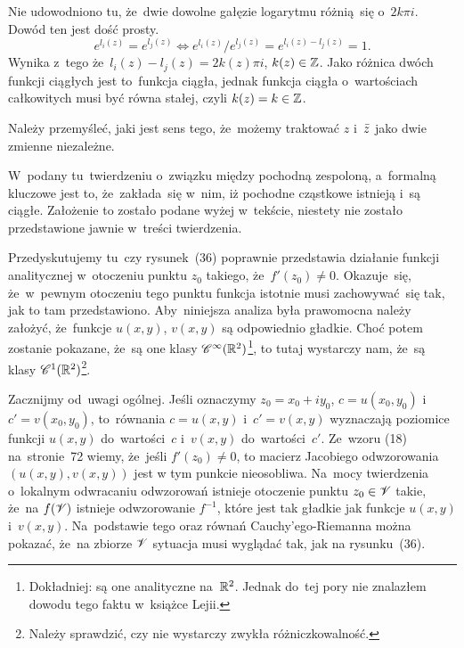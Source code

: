 \documentclass[a4paper,11pt]{article}
\begin{document}
\start {} Nie udowodniono tu, że~dwie dowolne gałęzie logarytmu
różnią~się o~$2 k \pi i$. Dowód ten jest dość prosty.
\begin{equation}
  \label{eq:Leja-38}
  e^{ l_{ i }( z ) } = e^{ l_{ j }( z ) }
  \iff e^{ l_{ i }( z ) } / e^{ l_{ j }( z ) } = e^{ l_{ i }( z ) - l_{ j }( z ) }
  = 1.
\end{equation}
Wynika z~tego że~$l_{ i }( z ) - l_{ j }( z ) = 2 k( z ) \pi i$,
$k( z ) \in \mathbb{Z}$. Jako różnica dwóch funkcji ciągłych jest to~funkcja
ciągła, jednak funkcja ciągła o~wartościach całkowitych musi być równa
stałej, czyli $k( z ) = k \in \mathbb{Z}$.

\vspace{\spaceFour}



\start {} Należy przemyśleć, jaki jest sens tego, że~możemy
traktować $z$ i~$\bar{z}$ jako dwie zmienne niezależne.

\vspace{\spaceFour}



\start {} W~podany tu~twierdzeniu o~związku między pochodną
zespoloną, a~formalną kluczowe jest to, że~zakłada~się w~nim, iż
pochodne cząstkowe istnieją i~są ciągłe. Założenie to zostało podane
wyżej w~tekście, niestety nie zostało przedstawione jawnie w~treści
twierdzenia.

\vspace{\spaceFour}



\start {} Przedyskutujemy tu~czy rysunek~(36) poprawnie
przedstawia działanie funkcji analitycznej w~otoczeniu punktu
$z_{ 0 }$ takiego, że~$f'( z_{ 0 } ) \neq 0$. Okazuje~się, że~w~pewnym
otoczeniu tego punktu funkcja istotnie musi zachowywać~się tak, jak to
tam przedstawiono. Aby~niniejsza analiza była prawomocna należy
założyć, że~funkcje $u( x, y )$, $v( x, y )$ są odpowiednio gładkie.
Choć potem zostanie pokazane, że~są one klasy
$\mathcal{C}^{ \infty }( \mathbb{R}^{ 2 } )$\footnote{Dokładniej: są one analityczne
  na~$\mathbb{R}^{ 2 }$. Jednak do~tej pory nie znalazłem dowodu tego faktu
  w~książce Lejii.}, to tutaj wystarczy nam, że~są klasy
$\mathcal{C}^{ 1 }( \mathbb{R}^{ 2 } )$\footnote{Należy sprawdzić, czy nie wystarczy zwykła
  różniczkowalność.}.

Zacznijmy od~uwagi ogólnej. Jeśli oznaczymy
$z_{ 0 } = x_{ 0 } + i y_{ 0 }$, $c = u( x_{ 0 }, y_{ 0 } )$
i~$c' = v( x_{ 0 }, y_{ 0 } )$, to~równania $c = u( x, y )$
i~$c' = v( x, y )$ wyznaczają poziomice funkcji $u( x, y )$
do~wartości~$c$ i~$v( x, y )$ do~wartości~$c'$. Ze~wzoru (18)
na~stronie~72 wiemy, że~jeśli $f'( z_{ 0 } ) \neq 0$, to macierz
Jacobiego odwzorowania $( u( x, y ), v( x, y ) )$ jest w tym punkcie
nieosobliwa. Na~mocy twierdzenia o~lokalnym odwracaniu odwzorowań
istnieje otoczenie punktu $z_{ 0 } \in \mathcal{V}$ takie, że~na
$f( \mathcal{V} )$ istnieje odwzorowanie $f^{ -1 }$, które jest tak
gładkie jak funkcje $u( x, y )$ i~$v( x, y )$. Na~podstawie tego oraz
równań Cauchy'ego-Riemanna można pokazać, że~na zbiorze $\mathcal{V}$
sytuacja musi wyglądać tak, jak na rysunku~(36).
\end{document}
